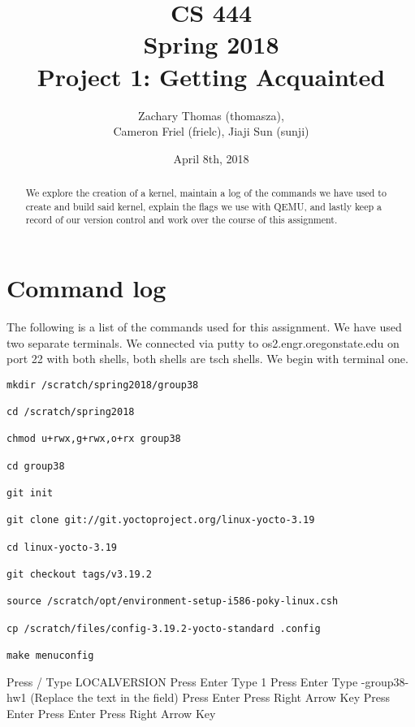 \documentclass[journal,10pt,onecolumn,letterpaper,draftclsnofoot]{IEEEtran}
\title{CS 444 \\ Spring 2018  \\ Project 1: Getting Acquainted}
\author{Zachary Thomas (thomasza),\\ Cameron Friel (frielc), Jiaji Sun (sunji)}
\date{April 8th, 2018}
\begin{document}
\maketitle
\begin{abstract} 
We explore the creation of a kernel, maintain a log of the commands we have used to create and build said kernel, explain the flags we use with QEMU, and lastly keep a record of our version control and work over the course of this assignment.
\end{abstract}
    
\newpage
\tableofcontents
\newpage

\section{Command log}
The following is a list of the commands used for this assignment. We have used two separate terminals. We connected via putty to os2.engr.oregonstate.edu on port 22 with both shells, both shells are tsch shells. We begin with terminal one. 
\begin{verbatim}
mkdir /scratch/spring2018/group38

cd /scratch/spring2018

chmod u+rwx,g+rwx,o+rx group38

cd group38

git init

git clone git://git.yoctoproject.org/linux-yocto-3.19

cd linux-yocto-3.19

git checkout tags/v3.19.2

source /scratch/opt/environment-setup-i586-poky-linux.csh

cp /scratch/files/config-3.19.2-yocto-standard .config

make menuconfig
\end{verbatim}
Press /\newline
Type LOCALVERSION\newline
Press Enter\newline
Type 1\newline
Press Enter\newline
Type -group38-hw1 (Replace the text in the field)\newline
Press Enter\newline
Press Right Arrow Key\newline
Press Enter\newline
Press Enter\newline
Press Right Arrow Key\newline
\end{document}
